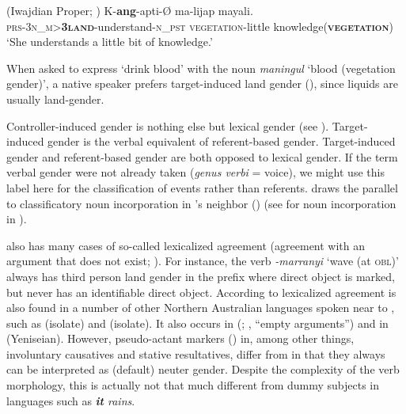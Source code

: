 \documentclass[output=collectionpaper]{langsci/langscibook}
\begin{document}
\ea\label{ex:WDG:73}
 (Iwajdian Proper; \citealt[972]{Singer2012})
\gll K-\textbf{ang}-apti-Ø	ma-lijap	mayali.\\
\textsc{prs-3n\_m>\textbf{3land}}-understand-\textsc{n\_pst}	\textsc{vegetation}-little	knowledge(\textbf{\textsc{vegetation}})\\
\glt `She understands a little bit of knowledge.'\\
\z

When asked to express `drink blood' with the noun \textit{maningul} `blood (vegetation gender)', a native speaker prefers target-induced land gender (\citealt[970]{Singer2012}), since liquids are usually land-gender.

Controller-induced gender is nothing else but lexical gender (see ). Target-induced gender is the verbal equivalent of referent-based gender. Target-induced gender and referent-based gender are both opposed to lexical gender. If the term verbal gender were not already taken (\textit{genus verbi} = voice), we might use this label here for the classification of events rather than referents. \cite[978]{Singer2012} draws the parallel to classificatory noun incorporation in 's neighbor  () (see  for noun incorporation in ).

 also has many cases of so-called lexicalized agreement (agreement with an argument that does not exist; \citealt{Singer2011}). For instance, the verb \mbox{\textit{-marranyi}} `wave (at \textsc{obl})' always has third person land gender in the prefix where direct object is marked, but never has an identifiable direct object. According to \citet[640]{Singer2011} lexicalized agreement is also found in a number of other Northern Australian languages spoken near to , such as  (isolate) and  (isolate). It also occurs in  (; \citealt[84]{Frantz1995}, ``empty arguments'') and in  (Yeniseian). However,  pseudo-actant markers (\citealt[79]{Vajda2003}) in, among other things, involuntary causatives and stative resultatives, differ from  in that they always can be interpreted as (default) neuter gender. Despite the complexity of the  verb morphology, this is actually not that much different from dummy subjects in  languages such as  \textit{\textbf{it} rains}.
\end{document}

